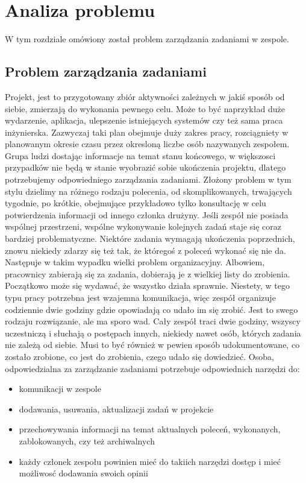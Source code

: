 
\chapter{Analiza problemu}
\thispagestyle{chapterBeginStyle}

W tym rozdziale omówiony został problem zarządzania zadaniami w zespole.
\section{Problem zarządzania zadaniami}

Projekt, jest to przygotowany zbiór aktywności zależnych w jakiś sposób od siebie, zmierzają do wykonania pewnego celu. Może to być naprzykład duże wydarzenie, aplikacja, ulepszenie istniejących systemów czy też sama praca inżynierska. Zazwyczaj taki plan obejmuje duży zakres pracy, rozciągniety w planowanym okresie czasu przez okresloną liczbe osób nazywanych zespołem. Grupa ludzi dostając informacje na temat stanu końcowego, w większosci przypadków nie będą w stanie wyobrazić sobie ukończenia projektu, dlatego potrzebujemy odpowiedniego zarządzania zadaniami. Złożony problem w tym stylu dzielimy na różnego rodzaju polecenia, od skomplikowanych, trwających tygodnie, po krótkie, obejmujące przykładowo tylko konsultację w celu potwierdzenia informacji od innego członka drużyny. Jeśli zespół nie posiada wspólnej przestrzeni, wspólne wykonywanie kolejnych zadań staje się coraz bardziej problematyczne. Niektóre zadania wymagają ukończenia poprzednich, znowu niekiedy zdarzy się też tak, że któregoś z poleceń wykonać się nie da. Następuje w takim wypadku wielki problem organizacyjny. Albowiem, pracownicy zabierają się za zadania, dobierają je z wielkiej listy do zrobienia. Początkowo może się wydawać, że wszystko działa sprawnie. Niestety, w tego typu pracy potrzebna jest wzajemna komunikacja, więc zespół organizuje codziennie dwie godziny gdzie opowiadają co udało im się zrobić. Jest to swego rodzaju rozwiązanie, ale ma sporo wad. Cały zespół traci dwie godziny, wszyscy uczestniczą i słuchają o postępach innych, niekiedy nawet osób, których zadania nie zależą od siebie. Musi to być również w pewien sposób udokumentowane, co zostało zrobione, co jest do zrobienia, czego udało się dowiedzieć. Osoba, odpowiedzialna za zarządzanie zadaniami potrzebuje odpowiednich narzędzi do:
\begin{itemize}
	\item  komunikacji w zespole
	\item  dodawania, usuwania, aktualizacji zadań w projekcie
	\item  przechowywania informacji na temat aktualnych poleceń, wykonanych, zablokowanych, czy też archiwalnych
	\item każdy członek zespołu powinien mieć do takiich narzędzi dostęp i mieć możliwosć dodawania swoich opinii
\end{itemize}

